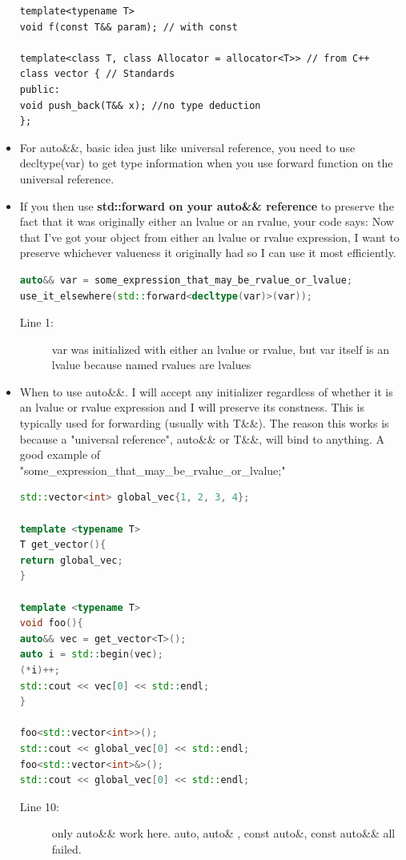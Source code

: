 \documentclass[a4paper,11pt,twoside]{book}
\begin{document}
\begin{itemize}
\begin{lstlisting}[numbers=none]
template<typename T>
void f(const T&& param); // with const

template<class T, class Allocator = allocator<T>> // from C++
class vector { // Standards
public:
void push_back(T&& x); //no type deduction
};
\end{lstlisting}


\item For auto\&\&, basic idea just like universal reference, you need to use decltype(var) to get type information when you use forward function on the universal reference. 

\item If you then use \textbf{std::forward on your auto\&\& reference} to preserve the fact that it was originally either an lvalue or an rvalue, your code says: Now that I've got your object from either an lvalue or rvalue expression, I want to preserve whichever valueness it originally had so I can use it most efficiently.

\begin{lstlisting}[frame=single, language=c++]
auto&& var = some_expression_that_may_be_rvalue_or_lvalue;
use_it_elsewhere(std::forward<decltype(var)>(var));
\end{lstlisting}
\begin{description}
	\item[Line 1:] var was initialized with either an lvalue or rvalue, but var itself is an lvalue because named rvalues are lvalues
\end{description}

\item When to use auto\&\&. I will accept any initializer regardless of whether it is an lvalue or rvalue expression and I will preserve its constness. This is typically used for forwarding (usually with T\&\&). The reason this works is because a "universal reference", auto\&\& or T\&\&, will bind to anything. A good example of\\
"some\_expression\_that\_may\_be\_rvalue\_or\_lvalue;"
\begin{lstlisting}[frame=single, language=c++]
std::vector<int> global_vec{1, 2, 3, 4};

template <typename T>
T get_vector(){
return global_vec;
}

template <typename T>
void foo(){
auto&& vec = get_vector<T>(); 
auto i = std::begin(vec);
(*i)++;
std::cout << vec[0] << std::endl;
}

foo<std::vector<int>>();
std::cout << global_vec[0] << std::endl;
foo<std::vector<int>&>();
std::cout << global_vec[0] << std::endl;
\end{lstlisting}
\begin{description}
	\item[Line 10:] only auto\&\& work here. auto, auto\& , const auto\&, const auto\&\& all failed.
\end{description}

\end{itemize}
\end{document}
